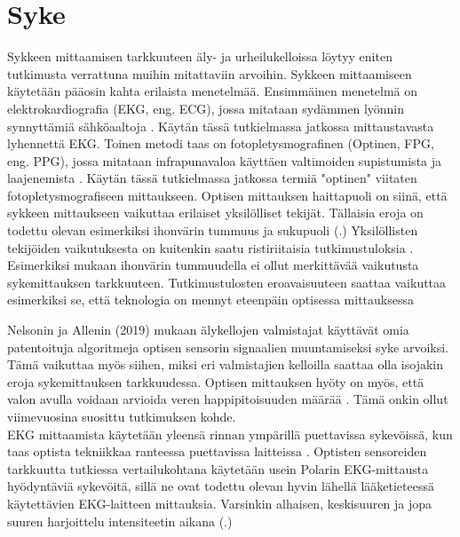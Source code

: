 \documentclass[utf8,bachelor,finnish]{bachelor}
\begin{document}
  \section{Syke}
  Sykkeen mittaamisen tarkkuuteen äly- ja urheilukelloissa löytyy eniten tutkimusta verrattuna muihin mitattaviin arvoihin.
   Sykkeen mittaamiseen käytetään pääosin kahta erilaista menetelmää. Ensimmäinen menetelmä on elektrokardiografia (EKG, eng. ECG), jossa mitataan sydämmen lyönnin
   synnyttämiä sähköaaltoja \parencite{noauthor_heart_nodate}. Käytän tässä tutkielmassa jatkossa mittaustavasta lyhennettä EKG.
    Toinen metodi taas on fotopletysmografinen (Optinen, FPG, eng. PPG), jossa mitataan infrapunavaloa käyttäen valtimoiden supistumista ja laajenemista \parencite{noauthor_heart_nodate}.
      Käytän tässä tutkielmassa jatkossa termiä "optinen" viitaten fotopletysmografiseen
      mittaukseen. Optisen mittauksen haittapuoli on siinä, että sykkeen mittaukseen vaikuttaa erilaiset yksilölliset tekijät.
       Tällaisia eroja on todettu olevan esimerkiksi ihonvärin tummuus ja sukupuoli (\cite{shcherbina_accuracy_2017,hochstadt_continuous_2020}.)
       Yksilöllisten tekijöiden vaikutuksesta on kuitenkin saatu ristiriitaisia tutkimustuloksia \parencite{pasadyn_accuracy_2019}.
        Esimerkiksi \cite{sanudo_pilot_2019, bent_investigating_2020} mukaan ihonvärin tummuudella ei ollut merkittävää vaikutusta sykemittauksen tarkkuuteen.
         Tutkimustulosten eroavaisuuteen saattaa vaikuttaa esimerkiksi se, että teknologia on mennyt eteenpäin optisessa mittauksessa \parencite{}
      
      
      Nelsonin ja Allenin (2019) mukaan älykellojen valmistajat käyttävät omia patentoituja algoritmeja optisen sensorin
       signaalien muuntamiseksi syke arvoiksi. Tämä vaikuttaa myös siihen, miksi eri valmistajien kelloilla saattaa olla isojakin eroja
        sykemittauksen tarkkuudessa. Optisen mittauksen hyöty on myös, että valon avulla voidaan arvioida veren happipitoisuuden määrää \parencite{noauthor_heart_nodate}.
         Tämä onkin ollut viimevuosina suosittu tutkimuksen kohde.\\


      
  EKG mittaamista käytetään yleensä rinnan ympärillä puettavissa sykevöissä, kun taas optista tekniikkaa ranteessa puettavissa laitteissa \parencite{noauthor_heart_nodate}.
   Optisten sensoreiden tarkkuutta tutkiessa vertailukohtana käytetään usein Polarin EKG-mittausta hyödyntäviä sykevöitä, sillä ne ovat todettu olevan hyvin lähellä
    lääketieteessä käytettävien EKG-laitteen mittauksia. Varsinkin alhaisen, keskisuuren ja jopa suuren harjoittelu intensiteetin aikana
     (\cite{gilgen-ammann_rr_2019, nelson_accuracy_2019}.) \\
\end{document}
